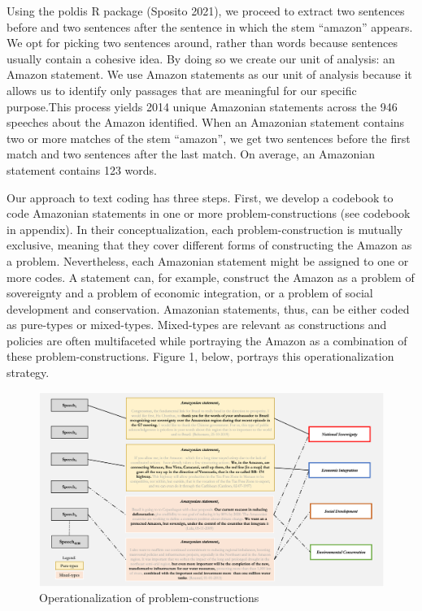 \documentclass[
  12pt,
]{article}
\begin{document}
Using the poldis R package (Sposito 2021), we proceed to extract two
sentences before and two sentences after the sentence in which the stem
``amazon'' appears. We opt for picking two sentences around, rather than
words because sentences usually contain a cohesive idea. By doing so we
create our unit of analysis: an Amazon statement. We use Amazon
statements as our unit of analysis because it allows us to identify only
passages that are meaningful for our specific purpose.This process
yields 2014 unique Amazonian statements across the 946 speeches about
the Amazon identified. When an Amazonian statement contains two or more
matches of the stem ``amazon'', we get two sentences before the first
match and two sentences after the last match. On average, an Amazonian
statement contains 123 words.

Our approach to text coding has three steps. First, we develop a
codebook to code Amazonian statements in one or more
problem-constructions (see codebook in appendix). In their
conceptualization, each problem-construction is mutually exclusive,
meaning that they cover different forms of constructing the Amazon as a
problem. Nevertheless, each Amazonian statement might be assigned to one
or more codes. A statement can, for example, construct the Amazon as a
problem of sovereignty and a problem of economic integration, or a
problem of social development and conservation. Amazonian statements,
thus, can be either coded as pure-types or mixed-types. Mixed-types are
relevant as constructions and policies are often multifaceted while
portraying the Amazon as a combination of these problem-constructions.
Figure 1, below, portrays this operationalization strategy.

\begin{landscape}

\begin{figure}
\includegraphics[width=1\linewidth]{figure1pic} \caption{Operationalization of problem-constructions}\label{fig:figure1}
\end{figure}

\end{landscape}
\end{document}
